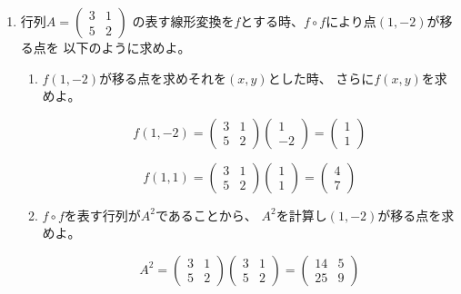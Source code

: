 \documentclass[10pt,a4paper]{ltjsarticle}
\begin{document}
\begin{enumerate}
\begin{enumerate}
       \end{enumerate}
       \hrulefill
 \item 行列$A=\begin{pmatrix} 3&1\\ 5&2\end{pmatrix}$
       の表す線形変換を$f$とする時、$f\circ f$により点$(1,-2)$が移る点を
       以下のように求めよ。
       \begin{enumerate}
        \item $f(1,-2)$が移る点を求めそれを$(x,y)$とした時、
              さらに$f(x,y)$を求めよ。

              \dotfill

              \begin{equation}
               f(1, -2) =
                \begin{pmatrix} 3&1\\ 5&2\end{pmatrix}
                \begin{pmatrix} 1\\ -2\end{pmatrix}
                =\begin{pmatrix} 1\\ 1\end{pmatrix}
              \end{equation}

              \begin{equation}
               f(1, 1) =
                \begin{pmatrix} 3&1\\ 5&2\end{pmatrix}
                \begin{pmatrix} 1\\ 1\end{pmatrix}
                =\begin{pmatrix} 4\\ 7\end{pmatrix}
              \end{equation}

              \hrulefill
        \item $f\circ f$を表す行列が$A^2$であることから、
              $A^2$を計算し$(1,-2)$が移る点を求めよ。

              \dotfill

              \begin{equation}
               A^2 =
                \begin{pmatrix} 3&1\\ 5&2\end{pmatrix}
                \begin{pmatrix} 3&1\\ 5&2\end{pmatrix}
                = \begin{pmatrix} 14&5\\ 25&9\end{pmatrix}
              \end{equation}


\end{enumerate}
\end{enumerate}
\end{document}
